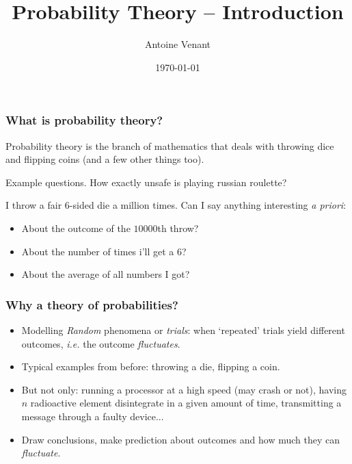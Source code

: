 \documentclass{beamer}
\begin{document}
\title{Probability Theory -- Introduction} 
\author{Antoine Venant}
\date{\today}
\maketitle

\begin{frame}
  \frametitle{What is probability theory?}

  Probability theory is the branch of mathematics that deals with throwing dice and flipping coins (and a few other things too).\\

  \begin{exampleblock}{Example questions.}
    How exactly unsafe is playing russian roulette?
    
    I throw a fair $6$-sided die a million times. Can I say anything interesting \emph{a priori}:
    \begin{itemize}
    \item About the outcome of the $10000$th throw?
    \item About the number of times i'll get a $6$?
    \item About the average of all numbers I got?
    \end{itemize}
  \end{exampleblock}

  
\end{frame}


\begin{frame}
  \frametitle{Why a theory of probabilities?}
  
    \begin{itemize}
    \item Modelling \emph{Random} phenomena or \emph{trials}: when `repeated' trials yield different outcomes, \emph{i.e.} the outcome \emph{fluctuates}.
    \item Typical examples from before: throwing a die, flipping a coin.
    \item But not only: running a processor at a high speed (may crash or not), having $n$ radioactive element disintegrate in a given amount of time, transmitting a message through a faulty device...
    \item Draw conclusions, make prediction about outcomes and how much they can \emph{fluctuate}.
    \end{itemize}
    
\end{frame}
\end{document}
